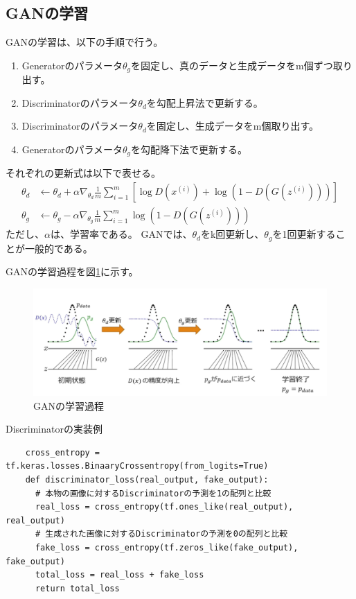 \documentclass{ltjsarticle}
\begin{document}
\subsection{GANの学習}
GANの学習は、以下の手順で行う。
\begin{enumerate}
  \item Generatorのパラメータ$\theta_g$を固定し、真のデータと生成データをm個ずつ取り出す。
  \item Discriminatorのパラメータ$\theta_d$を勾配上昇法で更新する。
  \item Discriminatorのパラメータ$\theta_d$を固定し、生成データをm個取り出す。
  \item Generatorのパラメータ$\theta_g$を勾配降下法で更新する。
\end{enumerate}
それぞれの更新式は以下で表せる。
\begin{align}
  \theta_d &\leftarrow \theta_d + \alpha \nabla_{\theta_d} \frac{1}{m} \sum_{i=1}^{m} \left[ \log D(x^{(i)}) + \log(1 - D(G(z^{(i)}))) \right] \\
  \theta_g &\leftarrow \theta_g - \alpha \nabla_{\theta_g} \frac{1}{m} \sum_{i=1}^{m} \log(1 - D(G(z^{(i)})))
\end{align}
ただし、$\alpha$は、学習率である。
GANでは、$\theta_d$をk回更新し、$\theta_g$を1回更新することが一般的である。

GANの学習過程を図\ref{fig:GAN}に示す。
\begin{figure}[htbp]
  \centering
  \includegraphics[width=13cm]{./capture/GAN.png}
  \caption{GANの学習過程}
  \label{fig:GAN}
\end{figure}

\begin{itembox}{}
  Discriminatorの実装例
  \begin{verbatim}
    cross_entropy = tf.keras.losses.BinaaryCrossentropy(from_logits=True)
    def discriminator_loss(real_output, fake_output):
      # 本物の画像に対するDiscriminatorの予測を1の配列と比較
      real_loss = cross_entropy(tf.ones_like(real_output), real_output)
      # 生成された画像に対するDiscriminatorの予測を0の配列と比較
      fake_loss = cross_entropy(tf.zeros_like(fake_output), fake_output)
      total_loss = real_loss + fake_loss
      return total_loss

  \end{verbatim}
\end{itembox}
\end{document}
